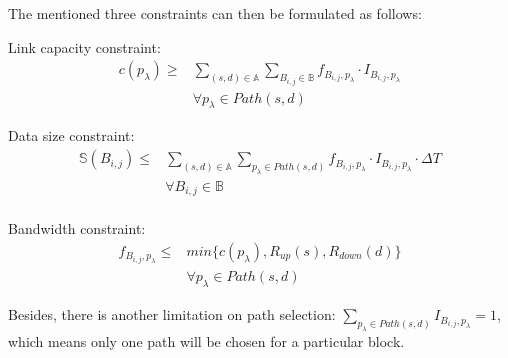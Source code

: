 The mentioned three constraints can then be formulated as follows:

Link capacity constraint:
\begin{equation}
\begin{split}
c(p_\lambda) \geq & \displaystyle{\sum_{(s,d)\in \mathbb{A}}} \displaystyle{\sum_{B_{i,j} \in \mathbb{B}}} f_{B_{i,j},p_\lambda} \cdot I_{B_{i,j},p_\lambda}\\
& \forall p_\lambda \in Path(s,d) \label{st:capacity}
\end{split}
\end{equation}

Data size constraint:
\begin{equation}
\begin{split}
\mathbb{S}(B_{i,j}) \leq & \displaystyle{\sum_{(s,d)\in \mathbb{A}}} \displaystyle{\sum_{p_{\lambda}\in Path(s,d)}} f_{B_{i,j},p_\lambda} \cdot I_{B_{i,j},p_\lambda} \cdot \Delta T\\
& \forall B_{i,j} \in \mathbb{B} \label{st:size}\\
\end{split}
\end{equation}

Bandwidth constraint:
\begin{equation}
\begin{split}
f_{B_{i,j},p_\lambda} \leq & min \{c(p_\lambda),R_{up}(s),R_{down}(d)\}\\
& \forall p_\lambda \in Path(s,d) \label{st:bottleneck}
\end{split}
\end{equation}

Besides, there is another limitation on path selection: $\displaystyle{\sum_{p_\lambda \in Path(s,d)}} I_{B_{i,j},p_\lambda} = 1$, which means only one path will be chosen for a particular block.

